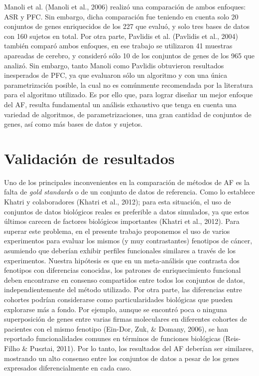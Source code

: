 \documentclass[12pt,twoside]{reedthesis}
\begin{document}
Manoli et al. (Manoli et al., 2006) realizó una comparación de ambos enfoques: ASR y PFC. Sin embargo, dicha comparación fue teniendo en cuenta solo 20 conjuntos de genes enriquecidos de los 227 que evaluó, y solo tres bases de datos con 160 sujetos en total. Por otra parte, Pavlidis et al. (Pavlidis et al., 2004) también comparó ambos enfoques, en ese trabajo se utilizaron 41 muestras apareadas de cerebro, y consideró sólo 10 de los conjuntos de genes de los 965 que analizó. Sin embargo, tanto Manoli como Pavlidis obtuvieron resultados inesperados de PFC, ya que evaluaron sólo un algoritmo y con una única parametrización posible, la cual no es comúnmente recomendada por la literatura para el algoritmo utilizado. Es por ello que, para lograr diseñar un mejor enfoque del AF, resulta fundamental un análisis exhaustivo que tenga en cuenta una variedad de algoritmos, de parametrizaciones, una gran cantidad de conjuntos de genes, así como más bases de datos y sujetos.

\hypertarget{validaciuxf3n-de-resultados}{%
\section{Validación de resultados}\label{validaciuxf3n-de-resultados}}

\par

Uno de los principales inconvenientes en la comparación de métodos de AF es la falta de \emph{gold standards} o de un conjunto de datos de referencia. Como lo establece Khatri y colaboradores (Khatri et al., 2012); para esta situación, el uso de conjuntos de datos biológicos reales es preferible a datos simulados, ya que estos últimos carecen de factores biológicos importantes (Khatri et al., 2012). Para superar este problema, en el presente trabajo proponemos el uso de varios experimentos para evaluar los mismos (y muy contrastantes) fenotipos de cáncer, asumiendo que deberían exhibir perfiles funcionales similares a través de los experimentos. Nuestra hipótesis es que en un meta-análisis que contrasta dos fenotipos con diferencias conocidas, los patrones de enriquecimiento funcional deben encontrarse en consenso compartidos entre todos los conjuntos de datos, independientemente del método utilizado. Por otra parte, las diferencias entre cohortes podrían considerarse como particularidades biológicas que pueden explorarse más a fondo. Por ejemplo, aunque se encontró poca o ninguna superposición de genes entre varias firmas moleculares en diferentes cohortes de pacientes con el mismo fenotipo (Ein-Dor, Zuk, \& Domany, 2006), se han reportado funcionalidades comunes en términos de funciones biológicas (Reis-Filho \& Pusztai, 2011). Por lo tanto, los resultados del AF deberían ser similares, mostrando un alto consenso entre los conjuntos de datos a pesar de los genes expresados diferencialmente en cada caso.
\end{document}
